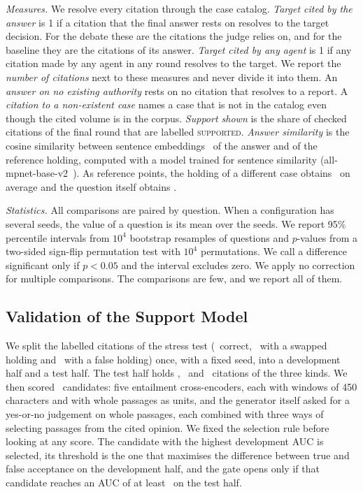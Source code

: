 \documentclass[conference]{IEEEtran}
\begin{document}
\emph{Measures.} We resolve every citation through the case catalog. \emph{Target cited by the answer} is 1 if a citation that the final answer rests on resolves to the target decision. For the debate these are the citations the judge relies on, and for the baseline they are the citations of its answer. \emph{Target cited by any agent} is 1 if any citation made by any agent in any round resolves to the target. We report the \emph{number of citations} next to these measures and never divide it into them. An \emph{answer on no existing authority} rests on no citation that resolves to a report. A \emph{citation to a non-existent case} names a case that is not in the catalog even though the cited volume is in the corpus. \emph{Support shown} is the share of checked citations of the final round that are labelled \textsc{supported}. \emph{Answer similarity} is the cosine similarity between sentence embeddings~\cite{sbert} of the answer and of the reference holding, computed with a model trained for sentence similarity (all-mpnet-base-v2~\cite{mpnet}). As reference points, the holding of a different case obtains \ResPaSimFloor\ on average and the question itself obtains \ResPaSimQuestion.

\emph{Statistics.} All comparisons are paired by question. When a configuration has several seeds, the value of a question is its mean over the seeds. We report 95\% percentile intervals from $10^4$ bootstrap resamples of questions and $p$-values from a two-sided sign-flip permutation test with $10^4$ permutations. We call a difference significant only if $p < 0.05$ and the interval excludes zero. We apply no correction for multiple comparisons. The comparisons are few, and we report all of them.

\subsection{Validation of the Support Model}\label{sec:validation}
We split the labelled citations of the stress test (\ResStressCorrectN\ correct, \ResStressMisattrN\ with a swapped holding and \ResStressCaseholdN\ with a false holding) once, with a fixed seed, into a development half and a test half. The test half holds \ResGateTestSetCorrect, \ResGateTestSetSwapped\ and \ResGateTestSetFalse\ citations of the three kinds. We then scored \ResGateCandidates\ candidates: five entailment cross-encoders, each with windows of 450 characters and with whole passages as units, and the generator itself asked for a yes-or-no judgement on whole passages, each combined with three ways of selecting passages from the cited opinion. We fixed the selection rule before looking at any score. The candidate with the highest development AUC is selected, its threshold is the one that maximises the difference between true and false acceptance on the development half, and the gate opens only if that candidate reaches an AUC of at least \ResGateRequiredAUC\ on the test half.
\end{document}
